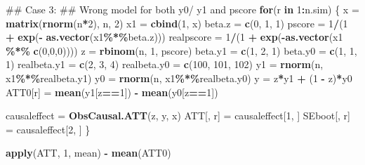 \documentclass[]{article}
\newenvironment{Shaded}{\begin{snugshade}}{\end{snugshade}}
\newcommand{\KeywordTok}[1]{\textcolor[rgb]{0.13,0.29,0.53}{\textbf{#1}}}
\newcommand{\DecValTok}[1]{\textcolor[rgb]{0.00,0.00,0.81}{#1}}
\newcommand{\StringTok}[1]{\textcolor[rgb]{0.31,0.60,0.02}{#1}}
\newcommand{\ControlFlowTok}[1]{\textcolor[rgb]{0.13,0.29,0.53}{\textbf{#1}}}
\newcommand{\OperatorTok}[1]{\textcolor[rgb]{0.81,0.36,0.00}{\textbf{#1}}}
\newcommand{\NormalTok}[1]{#1}
\begin{document}
\begin{Shaded}
\begin{Highlighting}[]
\NormalTok{## Case 3:}
\NormalTok{## Wrong model for both y0/ y1 and pscore}
\ControlFlowTok{for}\NormalTok{(r }\ControlFlowTok{in} \DecValTok{1}\OperatorTok{:}\NormalTok{n.sim)}
\NormalTok{\{}
\NormalTok{  x       =}\StringTok{ }\KeywordTok{matrix}\NormalTok{(}\KeywordTok{rnorm}\NormalTok{(n}\OperatorTok{*}\DecValTok{2}\NormalTok{), n, }\DecValTok{2}\NormalTok{)}
\NormalTok{  x1      =}\StringTok{ }\KeywordTok{cbind}\NormalTok{(}\DecValTok{1}\NormalTok{, x)}
\NormalTok{  beta.z  =}\StringTok{ }\KeywordTok{c}\NormalTok{(}\DecValTok{0}\NormalTok{, }\DecValTok{1}\NormalTok{, }\DecValTok{1}\NormalTok{)}
\NormalTok{  pscore  =}\StringTok{ }\DecValTok{1}\OperatorTok{/}\NormalTok{(}\DecValTok{1} \OperatorTok{+}\StringTok{ }\KeywordTok{exp}\NormalTok{(}\OperatorTok{-}\StringTok{ }\KeywordTok{as.vector}\NormalTok{(x1}\OperatorTok{\%*\%}\NormalTok{beta.z)))}
\NormalTok{  realpscore =}\StringTok{ }\DecValTok{1}\OperatorTok{/}\NormalTok{(}\DecValTok{1} \OperatorTok{+}\StringTok{ }\KeywordTok{exp}\NormalTok{(}\OperatorTok{-}\KeywordTok{as.vector}\NormalTok{(x1 }\OperatorTok{\%*\%}\StringTok{ }\KeywordTok{c}\NormalTok{(}\DecValTok{0}\NormalTok{,}\DecValTok{0}\NormalTok{,}\DecValTok{0}\NormalTok{))))}
\NormalTok{  z       =}\StringTok{ }\KeywordTok{rbinom}\NormalTok{(n, }\DecValTok{1}\NormalTok{, pscore)}
\NormalTok{  beta.y1 =}\StringTok{ }\KeywordTok{c}\NormalTok{(}\DecValTok{1}\NormalTok{, }\DecValTok{2}\NormalTok{, }\DecValTok{1}\NormalTok{)}
\NormalTok{  beta.y0 =}\StringTok{ }\KeywordTok{c}\NormalTok{(}\DecValTok{1}\NormalTok{, }\DecValTok{1}\NormalTok{, }\DecValTok{1}\NormalTok{)}
\NormalTok{  realbeta.y1 =}\StringTok{ }\KeywordTok{c}\NormalTok{(}\DecValTok{2}\NormalTok{, }\DecValTok{3}\NormalTok{, }\DecValTok{4}\NormalTok{)}
\NormalTok{  realbeta.y0 =}\StringTok{ }\KeywordTok{c}\NormalTok{(}\DecValTok{100}\NormalTok{, }\DecValTok{101}\NormalTok{, }\DecValTok{102}\NormalTok{)}
\NormalTok{  y1      =}\StringTok{ }\KeywordTok{rnorm}\NormalTok{(n, x1}\OperatorTok{\%*\%}\NormalTok{realbeta.y1)}
\NormalTok{  y0      =}\StringTok{ }\KeywordTok{rnorm}\NormalTok{(n, x1}\OperatorTok{\%*\%}\NormalTok{realbeta.y0)}
\NormalTok{  y       =}\StringTok{ }\NormalTok{z}\OperatorTok{*}\NormalTok{y1 }\OperatorTok{+}\StringTok{ }\NormalTok{(}\DecValTok{1} \OperatorTok{-}\StringTok{ }\NormalTok{z)}\OperatorTok{*}\NormalTok{y0}
\NormalTok{  ATT0[r] =}\StringTok{ }\KeywordTok{mean}\NormalTok{(y1[z}\OperatorTok{==}\DecValTok{1}\NormalTok{]) }\OperatorTok{-}\StringTok{ }\KeywordTok{mean}\NormalTok{(y0[z}\OperatorTok{==}\DecValTok{1}\NormalTok{])}
  
\NormalTok{  causaleffect =}\StringTok{ }\KeywordTok{ObsCausal.ATT}\NormalTok{(z, y, x)}
\NormalTok{  ATT[, r]     =}\StringTok{ }\NormalTok{causaleffect[}\DecValTok{1}\NormalTok{, ]}
\NormalTok{  SEboot[, r]  =}\StringTok{ }\NormalTok{causaleffect[}\DecValTok{2}\NormalTok{, ]}
\NormalTok{\}}

\KeywordTok{apply}\NormalTok{(ATT, }\DecValTok{1}\NormalTok{, mean) }\OperatorTok{-}\StringTok{ }\KeywordTok{mean}\NormalTok{(ATT0)}
\end{Highlighting}
\end{Shaded}
\end{document}
